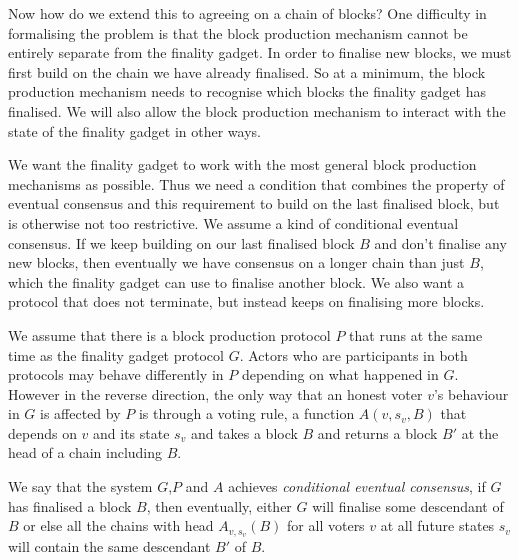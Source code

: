 \documentclass{article}
\begin{document}
Now how do we extend this to agreeing on a chain of blocks? One difficulty in formalising the problem is that the block production mechanism cannot be entirely separate from the finality gadget. In order to finalise new blocks, we must first build on the chain we have already finalised. So at a minimum, the block production mechanism needs to recognise which blocks the finality gadget has finalised. We will also allow the block production mechanism to interact with the state of the finality gadget in other ways.

We want the finality gadget to work with the most general block production mechanisms as possible. Thus we need a condition that combines the property of eventual consensus and this requirement to build on the last finalised block, but is otherwise not too restrictive.
We assume a kind of conditional eventual consensus.
If we keep building on our last finalised block $B$ and don't finalise any new blocks, then eventually we have consensus on a longer chain than just $B$, which the finality gadget can use to finalise another block.
We also want a protocol that does not terminate, but instead keeps on finalising more blocks. 

We assume that there is a block production protocol $P$ that runs at the same time as the finality gadget protocol $G$. Actors who are participants in both protocols may behave differently in $P$ depending on what happened in $G$.
However in the reverse direction, the only way that an honest voter $v$'s behaviour in $G$ is affected by $P$ is through a voting rule, a function $A(v,s_v,B)$ that depends on $v$ and its state $s_v$ and takes a block $B$ and returns a block $B'$ at the head of a chain including $B$.

We say that the system $G$,$P$ and $A$ achieves {\em conditional eventual consensus}, if $G$ has finalised a block $B$, then eventually, either $G$ will finalise some descendant of $B$ or else all the chains with head $A_{v,s_v}(B)$ for all voters $v$ at all future states $s_v$ will contain the same descendant $B'$ of $B$.
\end{document}
